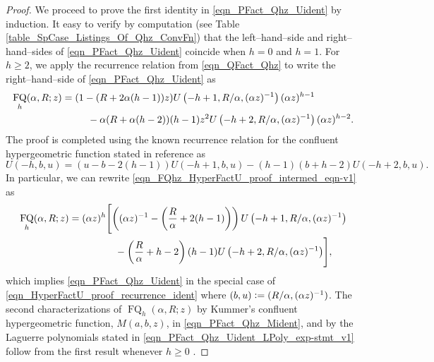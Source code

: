 \documentclass[12pt,reqno]{article}
\numberwithin{sfootnote}{section}
\numberwithin{equation}{section}
\theoremstyle{DefaultTheoremStyle}
\theoremstyle{definition}
\newcommand{\defequals}{\ensuremath{\vcentcolon=}}
\newcommand{\HypU}[3]{\ensuremath{U\left(#1, #2, #3\right)}}
\DeclareMathOperator{\FQ}{FQ}
\begin{document}
\begin{proof} 
We proceed to prove the first identity in 
\eqref{eqn_PFact_Qhz_Uident} by induction. 
It easy to verify by computation 
(see Table \ref{table_SpCase_Listings_Of_Qhz_ConvFn}) 
that the left--hand--side and right--hand--sides of 
\eqref{eqn_PFact_Qhz_Uident} coincide when $h = 0$ and $h = 1$. 
For $h \geq 2$, we apply the recurrence relation 
from \eqref{eqn_QFact_Qhz} to write the 
right--hand--side of \eqref{eqn_PFact_Qhz_Uident} as 
\begin{align} 
\label{eqn_FQhz_HyperFactU_proof_intermed_eqn-v1} 
\FQ_h(\alpha, R; z) & = (1-(R+2\alpha (h-1)) z) 
     \HypU{-h+1}{R / \alpha}{(\alpha z)^{-1}} (\alpha z)^{h-1} \\ 
\notag 
   & \phantom{= (1\ \ } - 
     \alpha (R+\alpha (h-2)) (h-1) z^2 
     \HypU{-h+2}{R / \alpha}{(\alpha z)^{-1}} (\alpha z)^{h-2}. 
\end{align} 
The proof is completed using the 
known recurrence relation for the confluent hypergeometric function 
stated in reference as \citep[\S 13.3(i)]{NISTHB} 
\begin{equation} 
\label{eqn_HyperFactU_proof_recurrence_ident} 
\HypU{-h}{b}{u} = (u-b-2(h-1)) \HypU{-h+1}{b}{u} - 
     (h-1) (b+h-2) \HypU{-h+2}{b}{u}. 
\end{equation} 
In particular, we can rewrite 
\eqref{eqn_FQhz_HyperFactU_proof_intermed_eqn-v1} as 
\begin{align} 
\notag 
\FQ_h(\alpha, R; z) & = 
     (\alpha z)^{h} \Biggl[\left((\alpha z)^{-1}-\left( 
     \frac{R}{\alpha} + 2(h-1)\right)\right) 
     \HypU{-h+1}{R / \alpha}{(\alpha z)^{-1}} \\ 
   & \phantom{= (\alpha z)^{h} \Biggl[ \Bigl(} - 
     \left(\frac{R}{\alpha}+h-2\right) (h-1) 
     \HypU{-h+2}{R / \alpha}{(\alpha z)^{-1}}\Biggr], 
\end{align} 
which implies \eqref{eqn_PFact_Qhz_Uident} in the special case of 
\eqref{eqn_HyperFactU_proof_recurrence_ident} where 
$(b, u) \defequals (R / \alpha, (\alpha z)^{-1})$. 
The second characterizations of $\FQ_h(\alpha, R; z)$ by 
Kummer's confluent hypergeometric function, $M(a, b, z)$, 
in \eqref{eqn_PFact_Qhz_Mident}, and by the 
Laguerre polynomials stated in 
\eqref{eqn_PFact_Qhz_Uident_LPoly_exp-stmt_v1} follow from the 
first result whenever $h \geq 0$ \citep[\S 13.6(v), \S 18.11(i)]{NISTHB}. 
\end{proof} 
\end{document}
